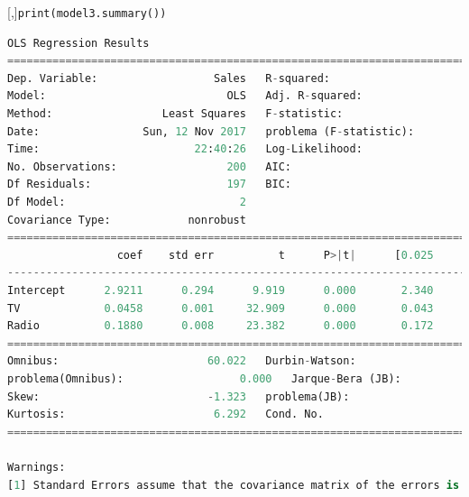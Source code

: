 [,]{\texttt{print(model3.summary())}}
\tiny
\begin{lstlisting}[language=Python]
                            OLS Regression Results
==============================================================================
Dep. Variable:                  Sales   R-squared:                       0.897
Model:                            OLS   Adj. R-squared:                  0.896
Method:                 Least Squares   F-statistic:                     859.6
Date:                Sun, 12 Nov 2017   problema (F-statistic):           4.83e-98
Time:                        22:40:26   Log-Likelihood:                -386.20
No. Observations:                 200   AIC:                             778.4
Df Residuals:                     197   BIC:                             788.3
Df Model:                           2
Covariance Type:            nonrobust
==============================================================================
                 coef    std err          t      P>|t|      [0.025      0.975]
------------------------------------------------------------------------------
Intercept      2.9211      0.294      9.919      0.000       2.340       3.502
TV             0.0458      0.001     32.909      0.000       0.043       0.048
Radio          0.1880      0.008     23.382      0.000       0.172       0.204
==============================================================================
Omnibus:                       60.022   Durbin-Watson:                   2.081
problema(Omnibus):                  0.000   Jarque-Bera (JB):              148.679
Skew:                          -1.323   problema(JB):                     5.19e-33
Kurtosis:                       6.292   Cond. No.                         425.
==============================================================================

Warnings:
[1] Standard Errors assume that the covariance matrix of the errors is correctly specified.
\end{lstlisting}

